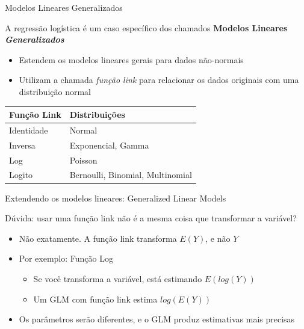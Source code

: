 \documentclass{beamer}\usepackage[]{graphicx}\usepackage[]{color}
\begin{document}
\begin{frame}{Modelos Lineares Generalizados}

A regressão logística é um caso específico dos chamados \textbf{Modelos Lineares \emph{Generalizados}}
\vfill
\begin{itemize}
\item Estendem os modelos lineares gerais para dados não-normais
\vfill
\item Utilizam a chamada \emph{função link} para relacionar os dados originais com uma distribuição normal
\end{itemize}

\begin{center}
\begin{tabular}{l{5cm} l}
\hline
Função Link & Distribuições \\
\hline
Identidade & Normal \\
Inversa & Exponencial, Gamma \\
Log & Poisson \\
Logito & Bernoulli, Binomial, Multinomial \\
\hline
\end{tabular}
\end{center}

\end{frame}

\begin{frame}{Extendendo os modelos lineares: Generalized Linear Models}

Dúvida: usar uma função link não é a mesma coisa que transformar a variável? \pause
\vfill
\begin{itemize}
\item Não exatamente. A função link transforma $E(Y)$, e não $Y$ \pause
\vfill
\item Por exemplo: Função Log
\vfill
\begin{itemize}
\item Se você transforma a variável, está estimando $E(log(Y))$ \pause
\vfill
\item Um GLM com função link estima $log(E(Y))$ \pause
\vfill
\end{itemize}
\item Os parâmetros serão diferentes, e o GLM produz estimativas mais precisas
\end{itemize}

\end{frame}
\end{document}
